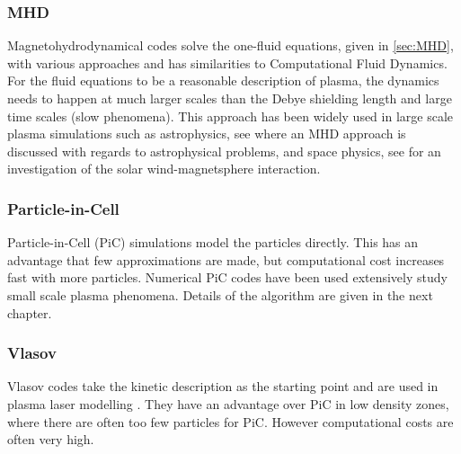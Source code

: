 	\subsubsection{MHD}
		Magnetohydrodynamical codes solve the one-fluid equations, given in \cref{sec:MHD},
		with various approaches and has
		similarities to Computational Fluid Dynamics. For the fluid equations
		to be a reasonable description of plasma, the dynamics needs to happen at much larger scales
		than the Debye shielding length and large time scales (slow phenomena).
		This approach has been widely used in large scale
		plasma simulations such as astrophysics, see \citet{hawley_numerical_1995} where an MHD approach is discussed with regards to astrophysical problems,
 		and space physics, see \citet{watanabe_global_1990} for an investigation of the solar wind-magnetsphere interaction.

	\subsubsection{Particle-in-Cell}
		Particle-in-Cell (PiC) simulations model the particles directly. This has an advantage that
		few approximations are made, but computational cost increases fast with more particles.
		Numerical PiC codes have been used extensively study small scale plasma phenomena.
		Details of the algorithm are given in the next chapter.

	\subsubsection{Vlasov}
		Vlasov codes take the kinetic description as the starting point and are used
		in plasma laser modelling \citep{bertrand_nonperiodic_1990}. They have an advantage over
		PiC in low density zones, where there are often too few particles for PiC. However computational
		costs are often very high.
